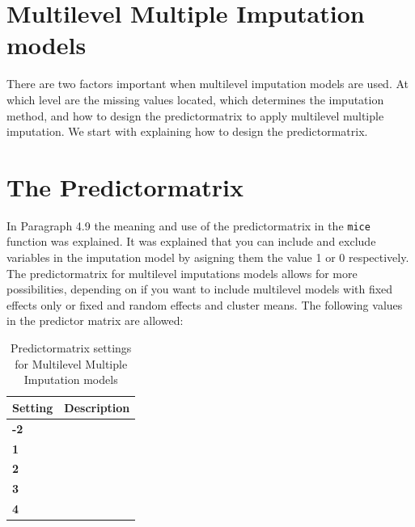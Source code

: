 \documentclass[
]{book}
\begin{document}
\hypertarget{multilevel-multiple-imputation-models}{%
\section{Multilevel Multiple Imputation models}\label{multilevel-multiple-imputation-models}}

There are two factors important when multilevel imputation models are used. At which level are the missing values located, which determines the imputation method, and how to design the predictormatrix to apply multilevel multiple imputation. We start with explaining how to design the predictormatrix.

\hypertarget{the-predictormatrix}{%
\section{The Predictormatrix}\label{the-predictormatrix}}

In Paragraph 4.9 the meaning and use of the predictormatrix in the \texttt{mice} function was explained. It was explained that you can include and exclude variables in the imputation model by asigning them the value 1 or 0 respectively. The predictormatrix for multilevel imputations models allows for more possibilities, depending on if you want to include multilevel models with fixed effects only or fixed and random effects and cluster means. The following values in the predictor matrix are allowed:

\begin{table}

\caption{\label{tab:unnamed-chunk-111}Predictormatrix settings for Multilevel Multiple Imputation models}
\centering
\begin{tabular}[t]{>{}l||>{\raggedright\arraybackslash}p{30em}}
\hline
Setting & Description\\
\hline
\textbf{-2} & \cellcolor{white}{to indicate the cluster variable}\\
\hline
\textbf{1} & \cellcolor{white}{imputation model with a fixed effect and a random intercept.}\\
\hline
\textbf{2} & \cellcolor{white}{imputation model with a fixed effect, random intercept and random slope.}\\
\hline
\textbf{3} & \cellcolor{white}{imputation model with a fixed effect, random intercept and cluster means.}\\
\hline
\textbf{4} & \cellcolor{white}{imputation model with a fixed effect, random intercept and random slope and cluster means.}\\
\hline
\end{tabular}
\end{table}
\end{document}
